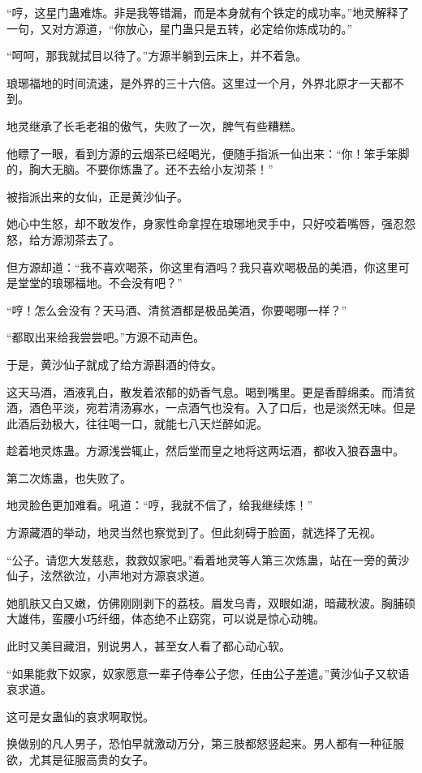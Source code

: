 \begin{this_body}
“哼，这星门蛊难炼。非是我等错漏，而是本身就有个铁定的成功率。”地灵解释了一句，又对方源道，“你放心，星门蛊只是五转，必定给你炼成功的。”

“呵呵，那我就拭目以待了。”方源半躺到云床上，并不着急。

琅琊福地的时间流速，是外界的三十六倍。这里过一个月，外界北原才一天都不到。

地灵继承了长毛老祖的傲气，失败了一次，脾气有些糟糕。

他瞟了一眼，看到方源的云烟茶已经喝光，便随手指派一仙出来：“你！笨手笨脚的，胸大无脑。不要你炼蛊了。还不去给小友沏茶！”

被指派出来的女仙，正是黄沙仙子。

她心中生怒，却不敢发作，身家性命拿捏在琅琊地灵手中，只好咬着嘴唇，强忍怨怒，给方源沏茶去了。

但方源却道：“我不喜欢喝茶，你这里有酒吗？我只喜欢喝极品的美酒，你这里可是堂堂的琅琊福地。不会没有吧？”

“哼！怎么会没有？天马酒、清贫酒都是极品美酒，你要喝哪一样？”

“都取出来给我尝尝吧。”方源不动声色。

于是，黄沙仙子就成了给方源斟酒的侍女。

这天马酒，酒液乳白，散发着浓郁的奶香气息。喝到嘴里。更是香醇绵柔。而清贫酒，酒色平淡，宛若清汤寡水，一点酒气也没有。入了口后，也是淡然无味。但是此酒后劲极大，往往喝一口，就能七八天烂醉如泥。

趁着地灵炼蛊。方源浅尝辄止，然后堂而皇之地将这两坛酒，都收入狼吞蛊中。

第二次炼蛊，也失败了。

地灵脸色更加难看。吼道：“哼，我就不信了，给我继续炼！”

方源藏酒的举动，地灵当然也察觉到了。但此刻碍于脸面，就选择了无视。

“公子。请您大发慈悲，救救奴家吧。”看着地灵等人第三次炼蛊，站在一旁的黄沙仙子，泫然欲泣，小声地对方源哀求道。

她肌肤又白又嫩，仿佛刚刚剥下的荔枝。眉发乌青，双眼如湖，暗藏秋波。胸脯硕大雄伟，蛮腰小巧纤细，体态绝不止窈窕，可以说是惊心动魄。

此时又美目藏泪，别说男人，甚至女人看了都心动心软。

“如果能救下奴家，奴家愿意一辈子侍奉公子您，任由公子差遣。”黄沙仙子又软语哀求道。

这可是女蛊仙的哀求啊取悦。

换做别的凡人男子，恐怕早就激动万分，第三肢都怒竖起来。男人都有一种征服欲，尤其是征服高贵的女子。


\end{this_body}

